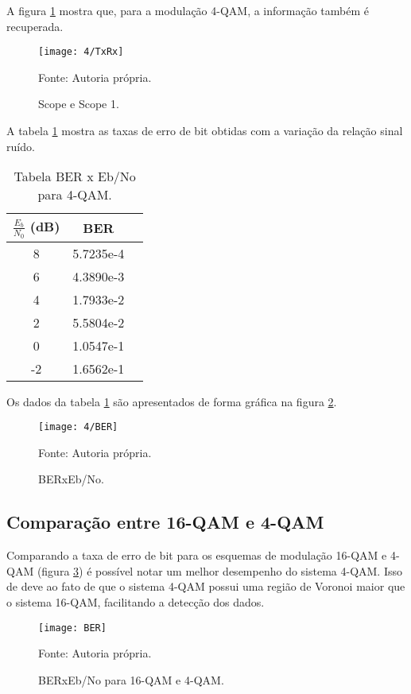A figura \ref{fig:4TxRx} mostra que, para a modulação 4-QAM, a informação também é recuperada.

\begin{figure}[H]
  \centering
  \caption{Scope e Scope 1.}
  \texttt{[image: 4/TxRx]}
  \label{fig:4TxRx}
  
  \small Fonte: Autoria própria.
\end{figure}

A tabela \ref{tab:rber4} mostra as taxas de erro de bit obtidas com a variação da relação sinal ruído.

\begin{table}[H]
  \begin{center}
    \caption{Tabela BER x Eb/No para 4-QAM.}
    \begin{tabular}{ccc}
      \toprule
      $\frac{E_b}{N_0}$ (dB) & BER \\
      \midrule
      8 & 5.7235e-4 \\
      6 & 4.3890e-3 \\
      4 & 1.7933e-2 \\
      2 & 5.5804e-2 \\
      0 & 1.0547e-1 \\
      -2 & 1.6562e-1 \\
      \bottomrule
    \end{tabular}
    \label{tab:rber4}
  \end{center}
\end{table}

Os dados da tabela \ref{tab:rber4} são apresentados de forma gráfica na figura \ref{fig:4BER}.

\begin{figure}[H]
  \centering
  \caption{BERxEb/No.}
  \texttt{[image: 4/BER]}
  \label{fig:4BER}
  
  \small Fonte: Autoria própria.
\end{figure}

\subsection{Comparação entre 16-QAM e 4-QAM}
Comparando a taxa de erro de bit para os esquemas de modulação 16-QAM e 4-QAM (figura \ref{fig:BER}) é possível notar um melhor desempenho do sistema 4-QAM. Isso de deve ao fato de que o sistema 4-QAM possui uma região de Voronoi maior que o sistema 16-QAM, facilitando a detecção dos dados.

\begin{figure}[H]
  \centering
  \caption{BERxEb/No para 16-QAM e 4-QAM.}
  \texttt{[image: BER]}
  \label{fig:BER}
  
  \small Fonte: Autoria própria.
\end{figure}